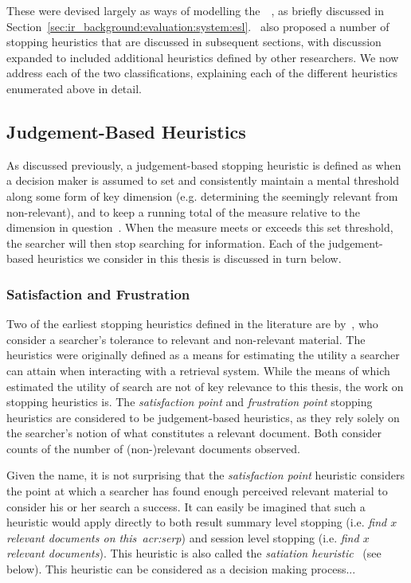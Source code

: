 These were devised largely as ways of modelling the~~\citep{cooper1968expected_search_length}, as briefly discussed in Section~\ref{sec:ir_background:evaluation:system:esl}.~\cite{nickles1995judgment} also proposed a number of stopping heuristics that are discussed in subsequent sections, with discussion expanded to included additional heuristics defined by other researchers. We now address each of the two classifications, explaining each of the different heuristics enumerated above in detail.

\subsection{Judgement-Based Heuristics}\label{sec:stopping_background:heuristics:judgement}
As discussed previously, a judgement-based stopping heuristic is defined as when a decision maker is assumed to set and consistently maintain a mental threshold along some form of key dimension (e.g. determining the seemingly relevant from non-relevant), and to keep a running total of the measure relative to the dimension in question~\citep{gettys1979hypothesis, nickles1995judgment}. When the measure meets or exceeds this set threshold, the searcher will then stop searching for information. Each of the judgement-based heuristics we consider in this thesis is discussed in turn below.

\subsubsection{Satisfaction and Frustration}\label{sec:stopping_background:heuristics:frustration}
Two of the earliest stopping heuristics defined in the literature are by~\cite{cooper1973retrieval_effectiveness_ii}, who consider a searcher's tolerance to relevant and non-relevant material. The heuristics were originally defined as a means for estimating the utility a searcher can attain when interacting with a retrieval system. While the means of which~\cite{cooper1973retrieval_effectiveness_ii} estimated the utility of search are not of key relevance to this thesis, the work on stopping heuristics is. The \emph{satisfaction point} and \emph{frustration point} stopping heuristics are considered to be judgement-based heuristics, as they rely solely on the searcher's notion of what constitutes a relevant document. Both consider counts of the number of (non-)relevant documents observed.

Given the name, it is not surprising that the \emph{satisfaction point} heuristic considers the point at which a searcher has found enough perceived relevant material to consider his or her search a success. It can easily be imagined that such a heuristic would apply directly to both result summary level stopping (i.e. \emph{find $x$ relevant documents on this~\gls{acr:serp}}) and session level stopping (i.e. \emph{find $x$ relevant documents}). This heuristic is also called the \emph{satiation heuristic}~\citep{simon1955satiation} (see below). This heuristic can be considered as a decision making process...

